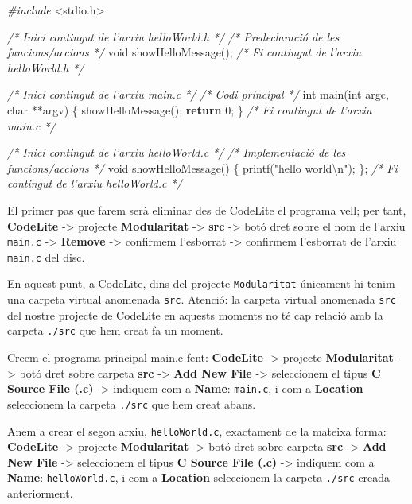 \documentclass[]{book}
\newenvironment{Shaded}{\begin{snugshade}}{\end{snugshade}}
\newcommand{\DataTypeTok}[1]{\textcolor[rgb]{0.13,0.29,0.53}{#1}}
\newcommand{\DecValTok}[1]{\textcolor[rgb]{0.00,0.00,0.81}{#1}}
\newcommand{\SpecialCharTok}[1]{\textcolor[rgb]{0.00,0.00,0.00}{#1}}
\newcommand{\StringTok}[1]{\textcolor[rgb]{0.31,0.60,0.02}{#1}}
\newcommand{\ImportTok}[1]{#1}
\newcommand{\CommentTok}[1]{\textcolor[rgb]{0.56,0.35,0.01}{\textit{#1}}}
\newcommand{\ControlFlowTok}[1]{\textcolor[rgb]{0.13,0.29,0.53}{\textbf{#1}}}
\newcommand{\PreprocessorTok}[1]{\textcolor[rgb]{0.56,0.35,0.01}{\textit{#1}}}
\newcommand{\NormalTok}[1]{#1}
\begin{document}
\begin{Shaded}
\begin{Highlighting}[]
\PreprocessorTok{#include }\ImportTok{<stdio.h>}

\CommentTok{/* Inici contingut de l’arxiu helloWorld.h */}
\CommentTok{/* Predeclaració de les funcions/accions */}
\DataTypeTok{void}\NormalTok{ showHelloMessage();}
\CommentTok{/* Fi contingut de l’arxiu helloWorld.h */}

\CommentTok{/* Inici contingut de l’arxiu main.c */}
\CommentTok{/* Codi principal */}
\DataTypeTok{int}\NormalTok{ main(}\DataTypeTok{int}\NormalTok{ argc, }\DataTypeTok{char}\NormalTok{ **argv) \{}
\NormalTok{    showHelloMessage();}
    \ControlFlowTok{return} \DecValTok{0}\NormalTok{;}
\NormalTok{\}}
\CommentTok{/* Fi contingut de l’arxiu main.c */}

\CommentTok{/* Inici contingut de l’arxiu helloWorld.c */}
\CommentTok{/* Implementació de les funcions/accions */}
\DataTypeTok{void}\NormalTok{ showHelloMessage() \{}
\NormalTok{    printf(}\StringTok{"hello world}\SpecialCharTok{\textbackslash{}n}\StringTok{"}\NormalTok{);}
\NormalTok{\};}
\CommentTok{/* Fi contingut de l’arxiu helloWorld.c */}
\end{Highlighting}
\end{Shaded}

El primer pas que farem serà eliminar des de CodeLite el programa vell;
per tant, \textbf{CodeLite} -\textgreater{} projecte
\textbf{Modularitat} -\textgreater{} \textbf{src} -\textgreater{} botó
dret sobre el nom de l'arxiu \texttt{main.c} -\textgreater{}
\textbf{Remove} -\textgreater{} confirmem l'esborrat -\textgreater{}
confirmem l'esborrat de l'arxiu \texttt{main.c} del disc.

En aquest punt, a CodeLite, dins del projecte \texttt{Modularitat}
únicament hi tenim una carpeta virtual anomenada \texttt{src}. Atenció:
la carpeta virtual anomenada \texttt{src} del nostre projecte de
CodeLite en aquests moments no té cap relació amb la carpeta
\texttt{./src} que hem creat fa un moment.

Creem el programa principal main.c fent: \textbf{CodeLite}
-\textgreater{} projecte \textbf{Modularitat} -\textgreater{} botó dret
sobre carpeta \textbf{src} -\textgreater{} \textbf{Add New File}
-\textgreater{} seleccionem el tipus \textbf{C Source File (.c)}
-\textgreater{} indiquem com a \textbf{Name}: \texttt{main.c}, i com a
\textbf{Location} seleccionem la carpeta \texttt{./src} que hem creat
abans.

Anem a crear el segon arxiu, \texttt{helloWorld.c}, exactament de la
mateixa forma: \textbf{CodeLite} -\textgreater{} projecte
\textbf{Modularitat} -\textgreater{} botó dret sobre carpeta
\textbf{src} -\textgreater{} \textbf{Add New File} -\textgreater{}
seleccionem el tipus \textbf{C Source File (.c)} -\textgreater{}
indiquem com a \textbf{Name}: \texttt{helloWorld.c}, i com a
\textbf{Location} seleccionem la carpeta \texttt{./src} creada
anteriorment.
\end{document}
